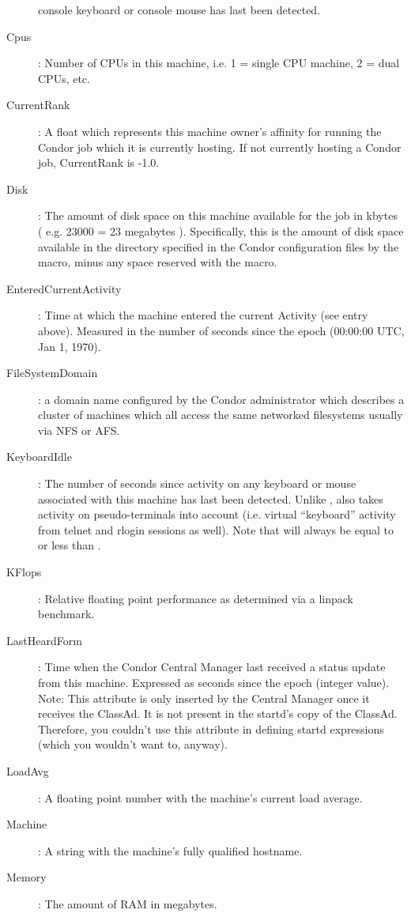 \begin{description}
console keyboard or console mouse has last been detected.
%
\item[Cpus] : Number of CPUs in this machine, i.e. 1 = single CPU machine, 2 = dual
CPUs, etc.
%
\item[CurrentRank] : A float which represents this machine owner's affinity
for running the Condor job which it is currently hosting.  If not
currently hosting a Condor job, CurrentRank is -1.0.
%
\item[Disk] : The amount of disk space on this machine available for
the job in kbytes ( e.g. 23000 = 23 megabytes ).  Specifically, this
is the amount of disk space available in the directory specified in
the Condor configuration files by the  macro, minus any
space reserved with the  macro.
%
\item[EnteredCurrentActivity] : Time at which the machine entered the 
current Activity (see  entry above).  Measured in the
number of seconds since the epoch (00:00:00 UTC, Jan 1, 1970).
%
\item[FileSystemDomain] : a domain name configured by the Condor 
administrator which describes a cluster of machines which all access 
the same networked filesystems usually via NFS or AFS.  
%
\item[KeyboardIdle] : The number of seconds since activity on any
keyboard or mouse associated with this machine has last been detected.
Unlike ,  also takes activity 
on pseudo-terminals into
account (i.e. virtual ``keyboard'' activity from telnet and rlogin
sessions as well).  Note that  will always be equal to or
less than .
%
\item[KFlops] : Relative floating point performance as determined via a
linpack benchmark.
%
\item[LastHeardForm] : Time when the Condor Central Manager last
received a status update from this machine.  
Expressed as seconds since the epoch (integer value).
Note: This attribute is only inserted by the Central Manager once it
receives the ClassAd.
It is not present in the startd's copy of the ClassAd.
Therefore, you couldn't use this attribute in defining startd
expressions (which you wouldn't want to, anyway).
%
\item[LoadAvg] : A floating point number with the machine's current load
average.
%
\item[Machine] : A string with the machine's fully qualified hostname.
%
\item[Memory] : The amount of RAM in megabytes.

\end{description}
